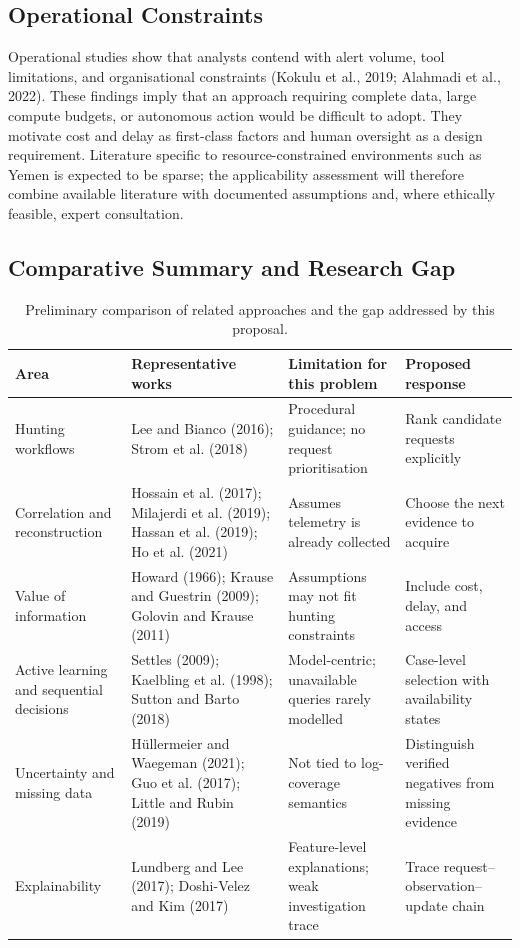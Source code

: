 \documentclass[a4paper,11pt,oneside]{article}
\begin{document}
\subsection{Operational Constraints}
Operational studies show that analysts contend with alert volume, tool limitations, and organisational constraints (Kokulu et al., 2019; Alahmadi et al., 2022). These findings imply that an approach requiring complete data, large compute budgets, or autonomous action would be difficult to adopt. They motivate cost and delay as first-class factors and human oversight as a design requirement. Literature specific to resource-constrained
environments such as Yemen is expected to be sparse; the applicability assessment will therefore combine available literature with documented assumptions and, where ethically feasible, expert consultation.
\subsection{Comparative Summary and Research Gap}
\begin{table}[htbp]
\centering
\caption{Preliminary comparison of related approaches and the gap addressed by this proposal.}
\label{tab:related-work}
\footnotesize
{}
\begin{tabularx}{\textwidth}{@{}>{\raggedright\arraybackslash}p{} >{\raggedright\arraybackslash}p{} >{\raggedright\arraybackslash}X >{\raggedright\arraybackslash}p{}@{}}
\toprule
\textbf{Area} & \textbf{Representative works} & \textbf{Limitation for this problem} & \textbf{Proposed response} \\
\midrule
Hunting workflows & Lee and Bianco (2016); Strom et al. (2018) & Procedural guidance; no request prioritisation & Rank candidate requests explicitly \\
Correlation and reconstruction & Hossain et al. (2017); Milajerdi et al. (2019); Hassan et al. (2019); Ho et al. (2021) & Assumes telemetry is already collected & Choose the next evidence to acquire \\
Value of information & Howard (1966); Krause and Guestrin (2009); Golovin and Krause (2011) & Assumptions may not fit hunting constraints & Include cost, delay, and access \\
Active learning and sequential decisions & Settles (2009); Kaelbling et al. (1998); Sutton and Barto (2018) & Model-centric; unavailable queries rarely modelled & Case-level selection with availability states \\
Uncertainty and missing data & H\"ullermeier and Waegeman (2021); Guo et al. (2017); Little and Rubin (2019) & Not tied to log-coverage semantics & Distinguish verified negatives from missing evidence \\
Explainability & Lundberg and Lee (2017); Doshi-Velez and Kim (2017) & Feature-level explanations; weak investigation trace & Trace request--observation--update chain \\
\bottomrule
\end{tabularx}
\end{table}
\end{document}

